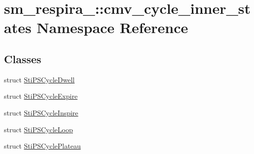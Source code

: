\hypertarget{namespacesm__respira__1_1_1cmv__cycle__inner__states}{}\section{sm\+\_\+respira\+\_\+:\+:cmv\+\_\+cycle\+\_\+inner\+\_\+states Namespace Reference}
\label{namespacesm__respira__1_1_1cmv__cycle__inner__states}
\subsection*{Classes}
\begin{DoxyCompactItemize}
\item 
struct \hyperlink{structsm__respira__1_1_1cmv__cycle__inner__states_1_1StiPSCycleDwell}{Sti\+P\+S\+Cycle\+Dwell}
\item 
struct \hyperlink{structsm__respira__1_1_1cmv__cycle__inner__states_1_1StiPSCycleExpire}{Sti\+P\+S\+Cycle\+Expire}
\item 
struct \hyperlink{structsm__respira__1_1_1cmv__cycle__inner__states_1_1StiPSCycleInspire}{Sti\+P\+S\+Cycle\+Inspire}
\item 
struct \hyperlink{structsm__respira__1_1_1cmv__cycle__inner__states_1_1StiPSCycleLoop}{Sti\+P\+S\+Cycle\+Loop}
\item 
struct \hyperlink{structsm__respira__1_1_1cmv__cycle__inner__states_1_1StiPSCyclePlateau}{Sti\+P\+S\+Cycle\+Plateau}
\end{DoxyCompactItemize}
